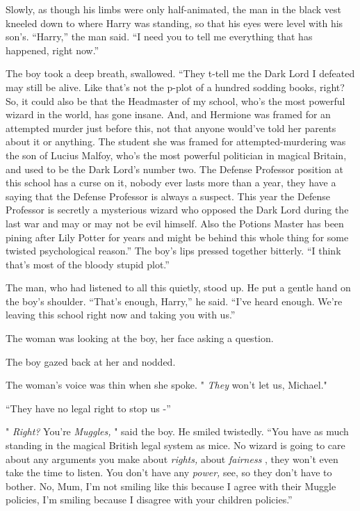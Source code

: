 Slowly, as though his limbs were only half-animated, the man in the
black vest kneeled down to where Harry was standing, so that his eyes
were level with his son's. ``Harry,'' the man said. ``I need you to tell
me everything that has happened, right now.''

The boy took a deep breath, swallowed. ``They t-tell me the Dark Lord I
defeated may still be alive. Like that's not the p-plot of a hundred
sodding books, right? So, it could also be that the Headmaster of my
school, who's the most powerful wizard in the world, has gone insane.
And, and Hermione was framed for an attempted murder just before this,
not that anyone would've told her parents about it or anything. The
student she was framed for attempted-murdering was the son of Lucius
Malfoy, who's the most powerful politician in magical Britain, and used
to be the Dark Lord's number two. The Defense Professor position at this
school has a curse on it, nobody ever lasts more than a year, they have
a saying that the Defense Professor is always a suspect. This year the
Defense Professor is secretly a mysterious wizard who opposed the Dark
Lord during the last war and may or may not be evil himself. Also the
Potions Master has been pining after Lily Potter for years and might be
behind this whole thing for some twisted psychological reason.'' The
boy's lips pressed together bitterly. ``I think that's most of the
bloody stupid plot.''

The man, who had listened to all this quietly, stood up. He put a gentle
hand on the boy's shoulder. ``That's enough, Harry,'' he said. ``I've
heard enough. We're leaving this school right now and taking you with
us.''

The woman was looking at the boy, her face asking a question.

The boy gazed back at her and nodded.

The woman's voice was thin when she spoke. " \emph{They} won't let us,
Michael."

``They have no legal right to stop us -''

" \emph{Right?} You're \emph{Muggles,} " said the boy. He smiled
twistedly. ``You have as much standing in the magical British legal
system as mice. No wizard is going to care about any arguments you make
about \emph{rights,} about \emph{fairness} , they won't even take the
time to listen. You don't have any \emph{power,} see, so they don't have
to bother. No, Mum, I'm not smiling like this because I agree with their
Muggle policies, I'm smiling because I disagree with your children
policies.''

